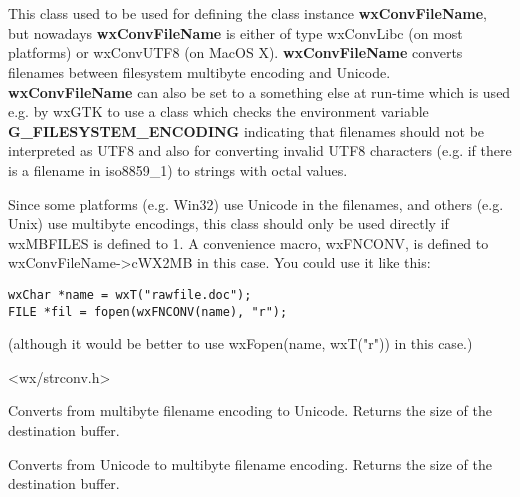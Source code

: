 %
%

\section{}\label{wxmbconvfile}

This class used to be used for defining the class instance
{\bf wxConvFileName}, but nowadays {\bf wxConvFileName} is
either of type wxConvLibc (on most platforms) or wxConvUTF8
(on MacOS X). {\bf wxConvFileName} converts filenames between 
filesystem multibyte encoding and Unicode. {\bf wxConvFileName} 
can also be set to a something else at run-time which is used 
e.g. by wxGTK to use a class which checks the environment 
variable {\bf G_FILESYSTEM_ENCODING} indicating that filenames 
should not be interpreted as UTF8 and also for converting 
invalid UTF8 characters (e.g. if there is a filename in iso8859_1)
to strings with octal values. 

Since some platforms (e.g. Win32) use Unicode in the filenames,
and others (e.g. Unix) use multibyte encodings, this class should only
be used directly if wxMBFILES is defined to 1. A convenience macro,
wxFNCONV, is defined to wxConvFileName->cWX2MB in this case. You could
use it like this:

\begin{verbatim}
wxChar *name = wxT("rawfile.doc");
FILE *fil = fopen(wxFNCONV(name), "r");
\end{verbatim}

(although it would be better to use wxFopen(name, wxT("r")) in this case.)




<wx/strconv.h>





\label{wxmbconvfilemb2wc}


Converts from multibyte filename encoding to Unicode. Returns the size of the destination buffer.

\label{wxmbconvfilewc2mb}


Converts from Unicode to multibyte filename encoding. Returns the size of the destination buffer.

